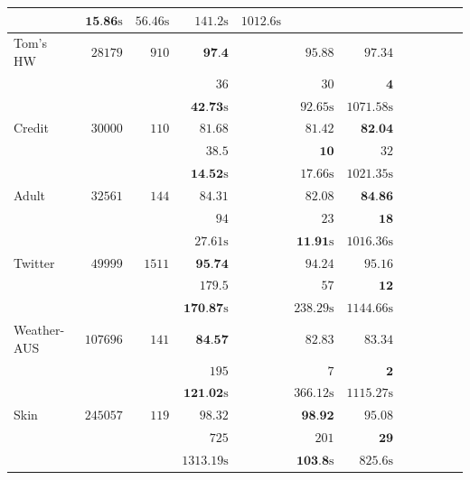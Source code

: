 \begin{table}
\begin{center}
\begin{tabular}{l  r  r r r r r r r rrr}
			& $   \textbf{15.86} \text{s}  $    & $   56.46 \text{s}  $    & $   141.2 \text{s}  $    & $   1012.6 \text{s}  $   \\
			\midrule 
			{ Tom's HW}   & $  28179 $  & $  910 $  & $   \textbf{97.4}  $    &   \multicolumn{1}{c}{\multirow{3}{*}{\textemdash}}       & $   95.88  $    & $   97.34  $   \\ & & 
			& $   36 $    &       & $   30 $    & $   \textbf{4} $   \\ & & 
			& $   \textbf{42.73} \text{s}  $    &       & $   92.65 \text{s}  $    & $   1071.58 \text{s}  $   \\
			\midrule 
			{ Credit}   & $  30000 $  & $  110 $  & $   81.68  $    &   \multicolumn{1}{c}{\multirow{3}{*}{\textemdash}}       & $   81.42  $    & $  \textbf{ 82.04}  $   \\ & & 
			& $   38.5  $    &       & $   \textbf{10} $    & $   32 $   \\ & & 
			& $   \textbf{14.52} \text{s}  $    &       & $   17.66 \text{s}  $    & $   1021.35 \text{s}  $   \\
			\midrule 
			{ Adult}   & $  32561 $  & $  144 $  & $   84.31  $    &   \multicolumn{1}{c}{\multirow{3}{*}{\textemdash}}       & $   82.08  $    & $   \textbf{84.86}  $   \\ & & 
			& $   94 $    &       & $   23 $    & $   \textbf{18} $   \\ & & 
			& $   27.61 \text{s}  $    &       & $   \textbf{11.91} \text{s}  $    & $   1016.36 \text{s}  $   \\
			\midrule 
			{ Twitter}   & $  49999 $  & $  1511 $  & $   \textbf{95.74}  $    &   \multicolumn{1}{c}{\multirow{3}{*}{\textemdash}}       & $   94.24  $    & $   95.16  $   \\ & & 
			& $   179.5  $    &       & $   57 $    & $   \textbf{12} $   \\ & & 
			& $   \textbf{170.87} \text{s}  $    &       & $   238.29 \text{s}  $    & $   1144.66 \text{s}  $   \\
			\midrule 
			{ Weather-AUS}   & $  107696 $  & $  141 $  & $   \textbf{84.57}  $    &   \multicolumn{1}{c}{\multirow{3}{*}{\textemdash}}       & $   82.83  $    & $   83.34  $   \\ & & 
			& $   195 $    &       & $   7 $    & $   \textbf{2} $   \\ & & 
			& $   \textbf{121.02} \text{s}  $    &       & $   366.12 \text{s}  $    & $   1115.27 \text{s}  $   \\
			\midrule 
			{ Skin}   & $  245057 $  & $  119 $  & $   98.32  $    &   \multicolumn{1}{c}{\multirow{3}{*}{\textemdash}}       & $   \textbf{98.92}  $    & $   95.08  $   \\ & & 
			& $   725 $    &       & $   201 $    & $   \textbf{29} $   \\ & & 
			& $   1313.19 \text{s}  $    &       & $   \textbf{103.8} \text{s}  $    & $   825.6 \text{s}  $   \\
			\bottomrule
		\end{tabular}
	\end{center}
	
	
\end{table}
